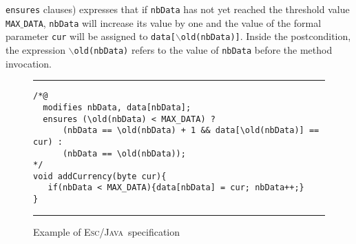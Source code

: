\documentclass[a4paper]{llncs}
\newcommand{\escj}{\textsc{Esc/Java}}
\begin{document}
\texttt{ensures} clauses) expresses that if \texttt{nbData} has not 
yet reached the threshold value \texttt{MAX$\_$DATA}, \texttt{nbData} 
will increase its value by one and the value of the formal parameter 
\texttt{cur} will be assigned to \texttt{data[\(\backslash\)old(nbData)]}.  
Inside the postcondition, the expression 
\texttt{$\backslash$old(nbData)} refers to the value of 
\texttt{nbData} before the method invocation. 
\begin{figure}[tbh]
\rule{\linewidth}{0.25mm}
\begin{verbatim}
/*@
  modifies nbData, data[nbData];
  ensures (\old(nbData) < MAX_DATA) ?
      (nbData == \old(nbData) + 1 && data[\old(nbData)] == cur) :
      (nbData == \old(nbData));
*/
void addCurrency(byte cur){
   if(nbData < MAX_DATA){data[nbData] = cur; nbData++;}
}
\end{verbatim}
\caption{Example of \escj~specification} 
\label{fig-add-cur} 
\rule{\linewidth}{0.25mm} 
\end{figure} 
\end{document}
